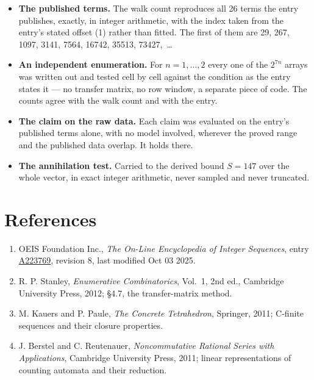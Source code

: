\documentclass[11pt]{article}
\theoremstyle{definition}
\begin{document}
\begin{itemize}

\item {\bfseries The published terms.} The walk count reproduces all 26 terms the entry publishes, exactly, in integer arithmetic, with the index taken from the entry's stated offset (1) rather than fitted. The first of them are 29, 267, 1097, 3141, 7564, 16742, 35513, 73427,~\dots

\item {\bfseries An independent enumeration.} For $n = 1,\dots,2$ every one of the $2^{7n}$ arrays was written out and tested cell by cell against the condition as the entry states it --- no transfer matrix, no row window, a separate piece of code. The counts agree with the walk count and with the entry.

\item {\bfseries The claim on the raw data.} Each claim was evaluated on the entry's published terms alone, with no model involved, wherever the proved range and the published data overlap. It holds there.

\item {\bfseries The annihilation test.} Carried to the derived bound $S = 147$ over the whole vector, in exact integer arithmetic, never sampled and never truncated.

\end{itemize}

\section{References}

\begin{enumerate}

\item OEIS Foundation Inc., \emph{The On-Line Encyclopedia of Integer Sequences}, entry \href{https://oeis.org/A223769}{A223769}, revision 8, last modified Oct 03 2025.

\item R. P. Stanley, \emph{Enumerative Combinatorics}, Vol.~1, 2nd ed., Cambridge University Press, 2012; \S4.7, the transfer-matrix method.

\item M. Kauers and P. Paule, \emph{The Concrete Tetrahedron}, Springer, 2011; C-finite sequences and their closure properties.

\item J. Berstel and C. Reutenauer, \emph{Noncommutative Rational Series with Applications}, Cambridge University Press, 2011; linear representations of counting automata and their reduction.

\end{enumerate}
\end{document}
